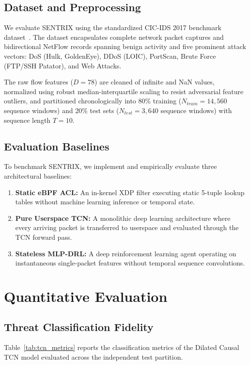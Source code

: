 \documentclass[conference,10pt]{IEEEtran}
\begin{document}
\subsection{Dataset and Preprocessing}
We evaluate SENTRIX using the standardized CIC-IDS 2017 benchmark dataset~\cite{sharafaldin2018toward}. The dataset encapsulates complete network packet captures and bidirectional NetFlow records spanning benign activity and five prominent attack vectors: DoS (Hulk, GoldenEye), DDoS (LOIC), PortScan, Brute Force (FTP/SSH Patator), and Web Attacks.

The raw flow features ($D=78$) are cleaned of infinite and NaN values, normalized using robust median-interquartile scaling to resist adversarial feature outliers, and partitioned chronologically into 80\% training ($N_{train} = 14,560$ sequence windows) and 20\% test sets ($N_{test} = 3,640$ sequence windows) with sequence length $T=10$.

\subsection{Evaluation Baselines}
To benchmark SENTRIX, we implement and empirically evaluate three architectural baselines:
\begin{enumerate}
    \item \textbf{Static eBPF ACL:} An in-kernel XDP filter executing static 5-tuple lookup tables without machine learning inference or temporal state.
    \item \textbf{Pure Userspace TCN:} A monolithic deep learning architecture where every arriving packet is transferred to userspace and evaluated through the TCN forward pass.
    \item \textbf{Stateless MLP-DRL:} A deep reinforcement learning agent operating on instantaneous single-packet features without temporal sequence convolutions.
\end{enumerate}

\section{Quantitative Evaluation}

\subsection{Threat Classification Fidelity}
Table~\ref{tab:tcn_metrics} reports the classification metrics of the Dilated Causal TCN model evaluated across the independent test partition.
\end{document}

